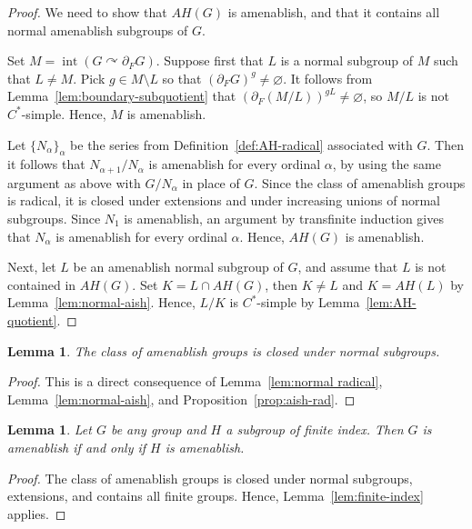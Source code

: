 \documentclass[a4paper]{amsart}
\theoremstyle{plain}
\newtheorem{lemma}[theorem]{Lemma}
\theoremstyle{definition}
\theoremstyle{remark}
\numberwithin{theorem}{section}
\begin{document}
\begin{proof}
We need to show that $AH(G)$ is amenablish,
and that it contains all normal amenablish subgroups of $G$.

Set $M=\operatorname{int}(G\curvearrowright\partial_F G)$.
Suppose first that $L$ is a normal subgroup of $M$ such that $L\neq M$.
Pick $g\in M\setminus L$ so that $(\partial_F G)^g\neq\varnothing$.
It follows from Lemma~\ref{lem:boundary-subquotient} that $(\partial_F(M/L))^{gL}\neq\varnothing$, so $M/L$ is not $C^*$-simple.
Hence, $M$ is amenablish.

Let $\{N_\alpha\}_\alpha$ be the series from Definition~\ref{def:AH-radical} associated with $G$.
Then it follows that $N_{\alpha+1}/N_\alpha$ is amenablish for every ordinal $\alpha$,
by using the same argument as above with $G/N_\alpha$ in place of $G$.
Since the class of amenablish groups is radical,
it is closed under extensions and under increasing unions of normal subgroups.
Since $N_1$ is amenablish, an argument by transfinite induction gives that $N_\alpha$ is amenablish for every ordinal $\alpha$.
Hence, $AH(G)$ is amenablish.

Next, let $L$ be an amenablish normal subgroup of $G$, and assume that $L$ is not contained in $AH(G)$.
Set $K=L\cap AH(G)$, then $K\neq L$ and $K=AH(L)$ by Lemma~\ref{lem:normal-aish}.
Hence, $L/K$ is $C^*$-simple by Lemma~\ref{lem:AH-quotient}.
\end{proof}

\begin{lemma}\label{lem:normal aish}
The class of amenablish groups is closed under normal subgroups.
\end{lemma}

\begin{proof}
This is a direct consequence of Lemma~\ref{lem:normal radical}, Lemma~\ref{lem:normal-aish}, and Proposition~\ref{prop:aish-rad}.
\end{proof}

\begin{lemma}\label{lem:finite index aish}
Let $G$ be any group and $H$ a subgroup of finite index.
Then $G$ is amenablish if and only if $H$ is amenablish.
\end{lemma}

\begin{proof}
The class of amenablish groups is closed under normal subgroups, extensions, and contains all finite groups.
Hence, Lemma~\ref{lem:finite-index} applies.
\end{proof}
\end{document}
